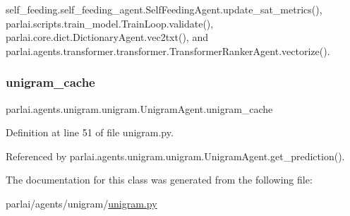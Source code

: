 self\+\_\+feeding.\+self\+\_\+feeding\+\_\+agent.\+Self\+Feeding\+Agent.\+update\+\_\+sat\+\_\+metrics(), parlai.\+scripts.\+train\+\_\+model.\+Train\+Loop.\+validate(), parlai.\+core.\+dict.\+Dictionary\+Agent.\+vec2txt(), and parlai.\+agents.\+transformer.\+transformer.\+Transformer\+Ranker\+Agent.\+vectorize().

\mbox{\label{classparlai_1_1agents_1_1unigram_1_1unigram_1_1UnigramAgent_a18103467daa976a54a84feb931cdf2be}} 
\subsubsection{\texorpdfstring{unigram\+\_\+cache}{unigram\_cache}}
{\footnotesize\ttfamily parlai.\+agents.\+unigram.\+unigram.\+Unigram\+Agent.\+unigram\+\_\+cache}



Definition at line 51 of file unigram.\+py.



Referenced by parlai.\+agents.\+unigram.\+unigram.\+Unigram\+Agent.\+get\+\_\+prediction().



The documentation for this class was generated from the following file\+:\begin{DoxyCompactItemize}
\item 
parlai/agents/unigram/\hyperlink{unigram_8py}{unigram.\+py}\end{DoxyCompactItemize}
